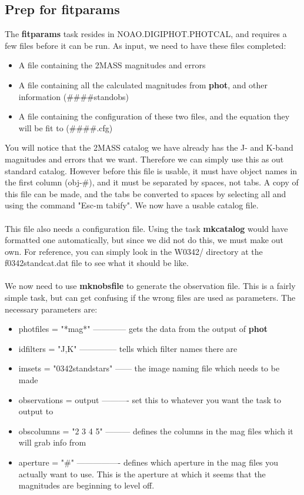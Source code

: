 \documentclass[a4paper]{article}
\begin{document}
\subsection{Prep for \textbf{fitparams}}
The \textbf{fitparams} task resides in NOAO.DIGIPHOT.PHOTCAL, and requires a few files before it can be run.  As input, we need to have these files completed:
\begin{itemize}
\item A file containing the 2MASS magnitudes and errors
\item A file containing all the calculated magnitudes from \textbf{phot}, and other information (\#\#\#\#standobs)
\item A file containing the configuration of these two files, and the equation they will be fit to (\#\#\#\#.cfg)
\end{itemize}
You will notice that the 2MASS catalog we have already has the J- and K-band magnitudes and errors that we want.  Therefore we can simply use this as out standard catalog.  However before this file is usable, it must have object names in the first column (obj-\#), and it must be separated by spaces, not tabs.  A copy of this file can be made, and the tabs be converted to spaces by selecting all and using the command "Esc-m tabify".  We now have a usable catalog file.  \\ \\
This file also needs a configuration file.  Using the task \textbf{mkcatalog} would have formatted one automatically, but since we did not do this, we must make out own.  For reference, you can simply look in the W0342/ directory at the f0342standcat.dat file to see what it should be like. \\ \\
We now need to use \textbf{mknobsfile} to generate the observation file.  This is a fairly simple task, but can get confusing if the wrong files are used as parameters.  The necessary parameters are:
\begin{itemize}
\item photfiles = "*mag*" ------------ gets the data from the output of \textbf{phot}
\item idfilters = "J,K" -------------- tells which filter names there are
\item imsets = "0342standstars" ------ the image naming file which needs to be made
\item observations = output ---------- set this to whatever you want the task to output to
\item obscolumns = "2 3 4 5" --------- defines the columns in the mag files which it will grab info from
\item aperture = "\#" ---------------- defines which aperture in the mag files you actually want to use.  This is the aperture at which it seems that the magnitudes are beginning to level off.
\end{itemize}
\end{document}
